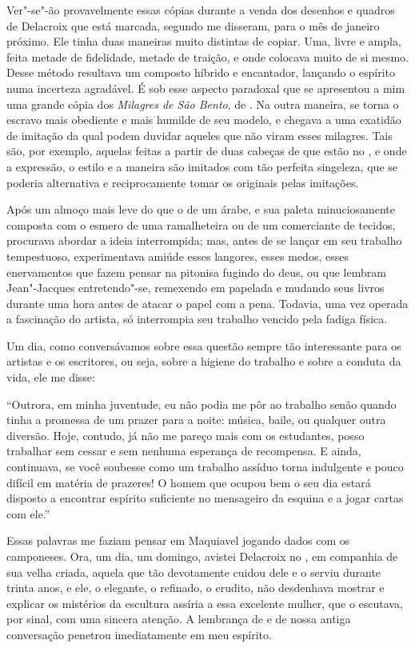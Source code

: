 Ver"-se"-ão provavelmente essas cópias durante a venda dos desenhos e
quadros de Delacroix que está marcada, segundo me disseram, para o mês
de janeiro próximo. Ele tinha duas maneiras muito distintas de copiar.
Uma, livre e ampla, feita metade de fidelidade, metade de traição, e
onde colocava muito de si mesmo. Desse método resultava um composto
híbrido e encantador, lançando o espírito numa incerteza agradável. É
sob esse aspecto paradoxal que se apresentou a mim uma grande cópia dos
\textit{Milagres de São Bento}, de . Na outra maneira, 
se torna o escravo mais obediente e mais humilde de seu modelo, e
chegava a uma exatidão de imitação da qual podem duvidar aqueles que
não viram esses milagres. Tais são, por exemplo, aquelas feitas a
partir de duas cabeças de  que estão no , e onde a
expressão, o estilo e a maneira são imitados com tão perfeita
singeleza, que se poderia alternativa e reciprocamente tomar os
originais pelas imitações.

Após um almoço mais leve do que o de um árabe, e sua paleta
minuciosamente composta com o esmero de uma ramalheteira ou de um
comerciante de tecidos,  procurava abordar a ideia
interrompida; mas, antes de se lançar em seu trabalho tempestuoso,
experimentava amiúde esses langores, esses medos, esses enervamentos
que fazem pensar na pitonisa fugindo do deus, ou que lembram
Jean"-Jacques  entretendo"-se, remexendo em papelada e mudando
seus livros durante uma hora antes de atacar o papel com a pena.
Todavia, uma vez operada a fascinação do artista, só interrompia seu
trabalho vencido pela fadiga física.

Um dia, como conversávamos sobre essa questão sempre tão interessante
para os artistas e os escritores, ou seja, sobre a higiene do trabalho
e sobre a conduta da vida, ele me disse:

``Outrora, em minha juventude, eu não podia me pôr ao
trabalho senão quando tinha a promessa de um prazer para a noite:
música, baile, ou qualquer outra diversão. Hoje, contudo, já não me
pareço mais com os estudantes, posso trabalhar sem cessar e sem nenhuma
esperança de recompensa. E ainda, continuava,
se você soubesse como um trabalho assíduo torna
indulgente e pouco difícil em matéria de prazeres! O homem que ocupou
bem o seu dia estará disposto a encontrar espírito suficiente no
mensageiro da esquina e a jogar cartas com ele.''

Essas palavras me faziam pensar em Maquiavel jogando dados com os
camponeses. Ora, um dia, um domingo, avistei Delacroix no , em
companhia de sua velha criada, aquela que tão devotamente cuidou dele e
o serviu durante trinta anos, e ele, o elegante, o refinado, o erudito,
não desdenhava mostrar e explicar os mistérios da escultura assíria a
essa excelente mulher, que o escutava, por sinal, com uma sincera
atenção. A lembrança de  e de nossa antiga conversação
penetrou imediatamente em meu espírito.

